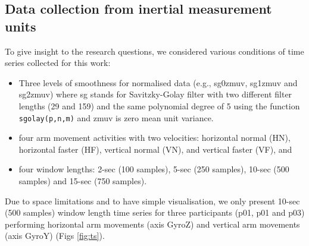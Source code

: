 \documentclass[fleqn,10pt]{wlscirep}
\begin{document}
\subsection*{Data collection from inertial measurement units} 
\label{sec:experiment:subsec:imu}
To give insight to the research questions, 
we considered various conditions of time series collected for this work: 
\begin{itemize}
\item Three levels of smoothness for normalised data 
	(e.g., sg0zmuv, sg1zmuv and sg2zmuv) where sg 
	stands for Savitzky-Golay filter with two different filter lengths (29 and 159) 
	and the same polynomial degree of 5 using the function \texttt{sgolay(p,n,m)} \cite{Rsignal}
	and zmuv is zero mean unit variance.
\item four arm movement activities with two velocities: 
	horizontal normal (HN), horizontal faster (HF), 
	vertical normal (VN), and vertical faster (VF), and
\item four window lengths: 2-sec (100 samples), 5-sec (250 samples), 
	10-sec (500 samples) and 15-sec (750 samples).
\end{itemize}
Due to space limitations and to have simple visualisation, 
we only present 10-sec (500 samples) window length time series for 
three participants (p01, p01 and p03) performing horizontal 
arm movements (axis GyroZ) and vertical arm movements (axis GyroY) (Figs \ref{fig:ts}).
\end{document}

